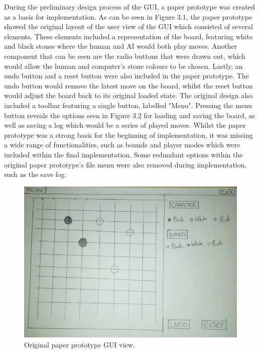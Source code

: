 \documentclass{l3proj}
\begin{document}
During the preliminary design process of the GUI, a paper prototype was created as a basis for implementation. As can be seen in Figure 3.1, the paper prototype showed the original layout of the user view of the GUI which consisted of several elements. These elements included a representation of the board, featuring white and black stones where the human and AI would both play moves. Another component that can be seen are the radio buttons that were drawn out, which would allow the human and computer's stone colours to be chosen. Lastly, an undo button and a reset button were also included in the paper prototype. The undo button would remove the latest move on the board, whilst the reset button would adjust the board back to its original loaded state. The original design also included a toolbar featuring a single button, labelled "Menu".  Pressing the menu button reveals the options seen in Figure 3.2 for loading and saving the board, as well as saving a log which would be a series of played moves. Whilst the paper prototype was a strong basis for the beginning of implementation, it was missing a wide range of functionalities, such as bounds and player modes which were included within the final implementation. Some redundant options within the original paper prototype's file menu were also removed during implementation, such as the save log.

\begin{figure}[H]
\centering
\includegraphics[scale=0.4]{Images/GUI-1-PP.png}
\caption{Original paper prototype GUI view.}
\end{figure}
\end{document}
